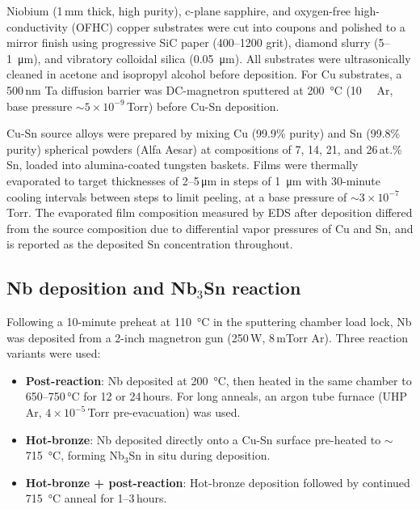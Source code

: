 \documentclass{iopjournal}
\begin{document}
Niobium (1\,mm thick, high purity), c-plane sapphire, and oxygen-free high-conductivity (OFHC) copper substrates were cut into  coupons and polished to a mirror finish using progressive SiC paper (400--1200 grit), diamond slurry (5--\qty{1}{\micro\meter}), and vibratory colloidal silica (\qty{0.05}{\micro\meter}). All substrates were ultrasonically cleaned in acetone and isopropyl alcohol before deposition. For Cu substrates, a 500\,nm Ta diffusion barrier was DC-magnetron sputtered at \qty{200}{\degreeCelsius} (\qty{10}{\milli\torr} Ar, base pressure $\sim 5 \times 10^{-9}$\,Torr) before Cu-Sn deposition.

Cu-Sn source alloys were prepared by mixing Cu (99.9\% purity) and Sn (99.8\% purity) spherical powders (Alfa Aesar) at compositions of 7, 14, 21, and 26\,at.\%\,Sn, loaded into alumina-coated tungsten baskets. Films were thermally evaporated to target thicknesses of 2--5\,\unit{\um} in steps of \qty{1}{\micro\meter} with 30-minute cooling intervals between steps to limit peeling, at a base pressure of $\sim 3 \times 10^{-7}$\,Torr. The evaporated film composition measured by EDS after deposition differed from the source composition due to differential vapor pressures of Cu and Sn, and is reported as the deposited Sn concentration throughout.

\subsection{Nb deposition and Nb$_3$Sn reaction}

Following a 10-minute preheat at \qty{110}{\degreeCelsius} in the sputtering chamber load lock, Nb was deposited from a 2-inch magnetron gun (250\,W, 8\,mTorr Ar). Three reaction variants were used:

\begin{itemize}
    \item \textbf{Post-reaction}: Nb deposited at \qty{200}{\degreeCelsius}, then heated in the same chamber to 650--750\,\unit{\degreeCelsius} for 12 or 24\,hours. For long anneals, an argon tube furnace (UHP Ar, $4 \times 10^{-5}$\,Torr pre-evacuation) was used.
    \item \textbf{Hot-bronze}: Nb deposited directly onto a Cu-Sn surface pre-heated to $\sim$\qty{715}{\degreeCelsius}, forming Nb$_3$Sn in situ during deposition.
    \item \textbf{Hot-bronze + post-reaction}: Hot-bronze deposition followed by continued \qty{715}{\degreeCelsius} anneal for 1--3\,hours.
\end{itemize}
\end{document}
